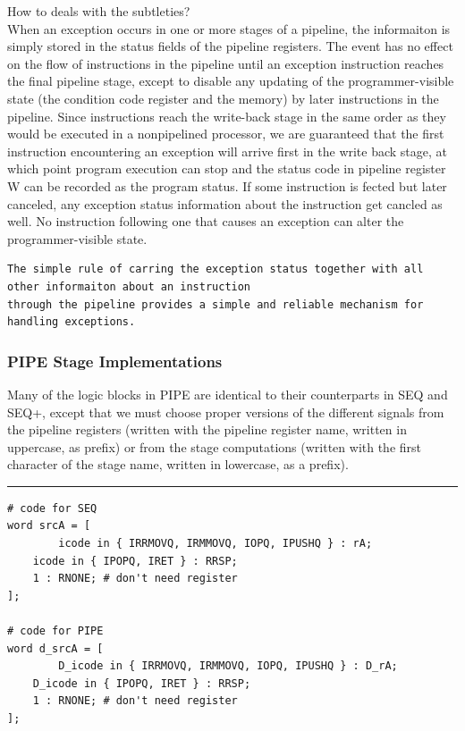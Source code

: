 \documentclass[11pt]{article}
\begin{document}
How to deals with the subtleties?\\
When an exception occurs in one or more stages of a pipeline, the informaiton is simply stored in the status fields of the pipeline registers. The event has no effect on the flow of instructions in the pipeline until an exception instruction reaches the final pipeline stage, except to disable any updating of the programmer-visible state (the condition code register and the memory) by later instructions in the pipeline. Since instructions reach the write-back stage in the same order as they would be executed in a nonpipelined processor, we are guaranteed that the first instruction encountering an exception will arrive first in the write back stage, at which point program execution can stop and the status code in pipeline register W can be recorded as the program status. If some instruction is fected but later canceled, any exception status information about the instruction get cancled as well. No instruction following one that causes an exception can alter the programmer-visible state.\\

\begin{verbatim}
The simple rule of carring the exception status together with all other informaiton about an instruction
through the pipeline provides a simple and reliable mechanism for handling exceptions.
\end{verbatim}


\subsubsection{PIPE Stage Implementations}
\label{sec:org668e3b6}

Many of the logic blocks in PIPE are identical to their counterparts in SEQ and SEQ+, except that we must choose proper versions of the different signals from the pipeline registers (written with the pipeline register name, written in uppercase, as prefix) or from the stage computations (written with the first character of the stage name, written in lowercase, as a prefix).\\

\noindent\rule{\textwidth}{0.5pt}
\begin{verbatim}
# code for SEQ
word srcA = [
        icode in { IRRMOVQ, IRMMOVQ, IOPQ, IPUSHQ } : rA;
	icode in { IPOPQ, IRET } : RRSP;
	1 : RNONE; # don't need register
];

# code for PIPE
word d_srcA = [
        D_icode in { IRRMOVQ, IRMMOVQ, IOPQ, IPUSHQ } : D_rA;
	D_icode in { IPOPQ, IRET } : RRSP;
	1 : RNONE; # don't need register
];
\end{verbatim}
\end{document}
